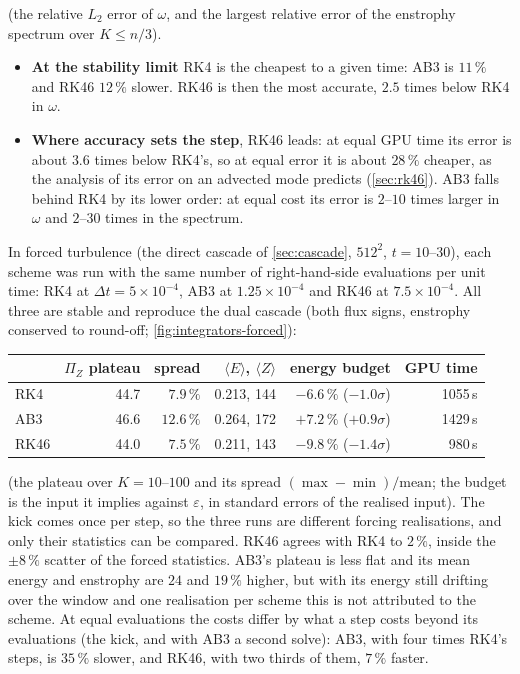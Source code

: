 \documentclass[11pt,a4paper]{article}
\newcommand{\dt}{\Delta t}
\begin{document}
(the relative $L_2$ error of $\omega$, and the largest relative error of the enstrophy spectrum over $K\le n/3$).
\begin{itemize}[leftmargin=2em]
  \item \textbf{At the stability limit} RK4 is the cheapest to a given time: AB3 is $11\,\%$ and RK46 $12\,\%$ slower.  RK46 is then the most accurate, $2.5$ times below RK4 in $\omega$.
  \item \textbf{Where accuracy sets the step}, RK46 leads: at equal GPU time its error is about $3.6$ times below RK4's, so at equal error it is about $28\,\%$ cheaper, as the analysis of its error on an advected mode predicts (\cref{sec:rk46}).  AB3 falls behind RK4 by its lower order: at equal cost its error is $2$--$10$ times larger in $\omega$ and $2$--$30$ times in the spectrum.
\end{itemize}

In forced turbulence (the direct cascade of \cref{sec:cascade}, $512^2$, $t=10$--$30$), each scheme was run with the same number of right-hand-side evaluations per unit time: RK4 at $\dt=5\times10^{-4}$, AB3 at $1.25\times10^{-4}$ and RK46 at $7.5\times10^{-4}$.  All three are stable and reproduce the dual cascade (both flux signs, enstrophy conserved to round-off; \cref{fig:integrators-forced}):
\begin{center}\small
\begin{tabular}{lrrrrr}
\toprule
 & $\Pi_Z$ plateau & spread & $\langle E\rangle$, $\langle Z\rangle$ & energy budget & GPU time \\
\midrule
RK4 & 44.7 & $7.9\,\%$ & 0.213, 144 & $-6.6\,\%$ ($-1.0\sigma$) & 1055\,s \\
AB3 & 46.6 & $12.6\,\%$ & 0.264, 172 & $+7.2\,\%$ ($+0.9\sigma$) & 1429\,s \\
RK46 & 44.0 & $7.5\,\%$ & 0.211, 143 & $-9.8\,\%$ ($-1.4\sigma$) & 980\,s \\
\bottomrule
\end{tabular}
\end{center}
(the plateau over $K=10$--$100$ and its spread $(\max-\min)/\text{mean}$; the budget is the input it implies against $\varepsilon$, in standard errors of the realised input).  The kick comes once per step, so the three runs are different forcing realisations, and only their statistics can be compared.  RK46 agrees with RK4 to $2\,\%$, inside the $\pm8\,\%$ scatter of the forced statistics.  AB3's plateau is less flat and its mean energy and enstrophy are $24$ and $19\,\%$ higher, but with its energy still drifting over the window and one realisation per scheme this is not attributed to the scheme.  At equal evaluations the costs differ by what a step costs beyond its evaluations (the kick, and with AB3 a second solve): AB3, with four times RK4's steps, is $35\,\%$ slower, and RK46, with two thirds of them, $7\,\%$ faster.
\end{document}

